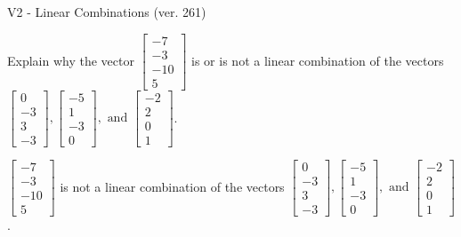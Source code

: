 \begin{exercise}
  \begin{exerciseTitle}V2 - Linear Combinations (ver. 261)\end{exerciseTitle}
  \begin{exerciseStatement}
    Explain why the vector \(\left[\begin{array}{c}
-7 \\
-3 \\
-10 \\
5
\end{array}\right]\)  is or is not a linear 
	combination of the vectors \(\left[\begin{array}{c}
0 \\
-3 \\
3 \\
-3
\end{array}\right] , \left[\begin{array}{c}
-5 \\
1 \\
-3 \\
0
\end{array}\right] , \text{ and } \left[\begin{array}{c}
-2 \\
2 \\
0 \\
1
\end{array}\right]\).
	


  \end{exerciseStatement}
  \begin{exerciseAnswer}
   \(\left[\begin{array}{c}
-7 \\
-3 \\
-10 \\
5
\end{array}\right]\) 
  	 is not  
	a linear combination of the vectors \(\left[\begin{array}{c}
0 \\
-3 \\
3 \\
-3
\end{array}\right] , \left[\begin{array}{c}
-5 \\
1 \\
-3 \\
0
\end{array}\right] , \text{ and } \left[\begin{array}{c}
-2 \\
2 \\
0 \\
1
\end{array}\right]\).

	
  


  \end{exerciseAnswer}
\end{exercise}